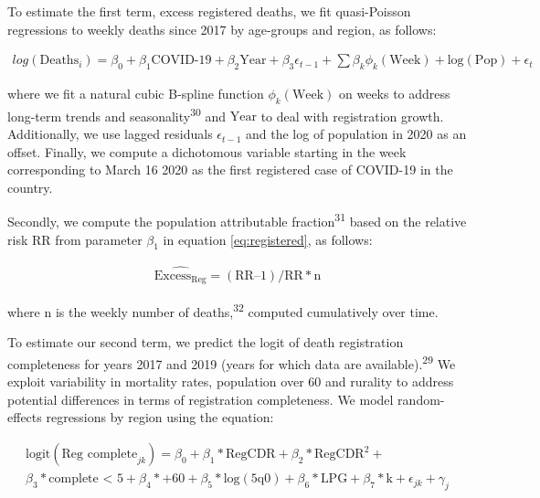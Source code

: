 \documentclass[
]{article}
\begin{document}
To estimate the first term, excess registered deaths, we fit quasi-Poisson regressions to weekly deaths since 2017 by age-groups and region, as follows:

\begin{equation}
  \label{eq:registered}
  \begin{aligned}
  log(\text{Deaths}_{i})=\beta_0+\beta_1\text{COVID-19}+\beta_2\text{Year}+
  \beta_3\epsilon_{t-1}+
  \sum\beta_k\phi_{k}(\text{Week})+
  \text{log}(\text{Pop})+\epsilon_{t}
   \end{aligned}  
\end{equation}

where we fit a natural cubic B-spline function \(\phi_{k}(\text{Week})\) on weeks to address long-term trends and seasonality\textsuperscript{30} and \(\text{Year}\) to deal with registration growth. Additionally, we use lagged residuals \(\epsilon_{t-1}\) and the log of population in 2020 as an offset. Finally, we compute a dichotomous variable starting in the week corresponding to March 16 2020 as the first registered case of COVID-19 in the country.

Secondly, we compute the population attributable fraction\textsuperscript{31} based on the relative risk \(\text{RR}\) from parameter \(\beta_1\) in equation \eqref{eq:registered}, as follows:

\begin{equation}
\label{eq:rr}
\begin{aligned}
\widehat{{\text{Excess}}_\text{Reg}} = (\text{RR}–1)/\text{RR}*\text{n}
\end{aligned}
\end{equation}

where \(\text{n}\) is the weekly number of deaths,\textsuperscript{32} computed cumulatively over time.

To estimate our second term, we predict the logit of death registration completeness for years 2017 and 2019 (years for which data are available).\textsuperscript{29} We exploit variability in mortality rates, population over 60 and rurality to address potential differences in terms of registration completeness. We model random-effects regressions by region using the equation:

\begin{equation}
\label{eq:adair}
\begin{aligned}
  \text{logit}(\text{Reg complete}_{jk})=
  \beta_0+
  \beta_1*\text{RegCDR}+
  \beta_2*\text{RegCDR}^2+\\
  \beta_3*\text{complete < 5}+
  \beta_4*\text{+60}+
  \beta_5*\text{log}(\text{5q0})+ 
  \beta_6*\text{LPG} +
  \beta_7*\text{k}+
  \epsilon_{jk} + 
  \gamma_{j}
\end{aligned}
\end{equation}
\end{document}
